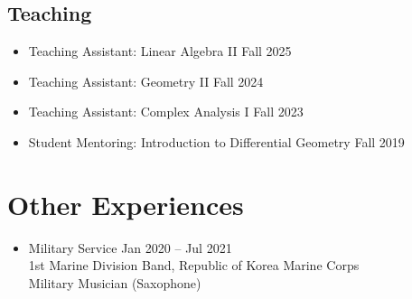 \documentclass[11pt,a4paper]{article}
\begin{document}
\subsection*{Teaching}

\begin{itemize}
\item
	Teaching Assistant: Linear Algebra II
	\hfill{\small Fall 2025}
\item
	Teaching Assistant: Geometry II
	\hfill{\small Fall 2024}
\item
	Teaching Assistant: Complex Analysis I
	\hfill{\small Fall 2023}
\item
	Student Mentoring: Introduction to Differential Geometry
	\hfill{\small Fall 2019}\\
\end{itemize}


\section*{Other Experiences}
\begin{itemize}
\item
	Military Service
	\hfill{\small Jan 2020 -- Jul 2021}\\
	1st Marine Division Band, Republic of Korea Marine Corps\\
	Military Musician (Saxophone)
\end{itemize}
\end{document}

